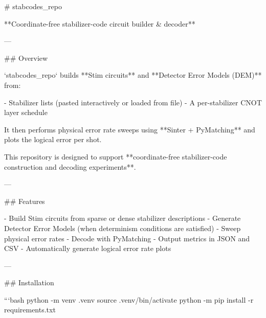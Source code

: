 # stabcodes_repo

**Coordinate-free stabilizer-code circuit builder & decoder**

---

## Overview

`stabcodes_repo` builds **Stim circuits** and **Detector Error Models (DEM)** from:

- Stabilizer lists (pasted interactively or loaded from file)  
- A per-stabilizer CNOT layer schedule  

It then performs physical error rate sweeps using **Sinter + PyMatching** and plots the logical error per shot.

This repository is designed to support **coordinate-free stabilizer-code construction and decoding experiments**.

---

## Features

- Build Stim circuits from sparse or dense stabilizer descriptions  
- Generate Detector Error Models (when determinism conditions are satisfied)  
- Sweep physical error rates  
- Decode with PyMatching  
- Output metrics in JSON and CSV  
- Automatically generate logical error rate plots  

---

## Installation

```bash
python -m venv .venv
source .venv/bin/activate
python -m pip install -r requirements.txt
